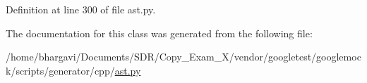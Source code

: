 Definition at line 300 of file ast.\+py.



The documentation for this class was generated from the following file\+:\begin{DoxyCompactItemize}
\item 
/home/bhargavi/\+Documents/\+S\+D\+R/\+Copy\+\_\+\+Exam\+\_\+X/vendor/googletest/googlemock/scripts/generator/cpp/\hyperlink{ast_8py}{ast.\+py}\end{DoxyCompactItemize}
